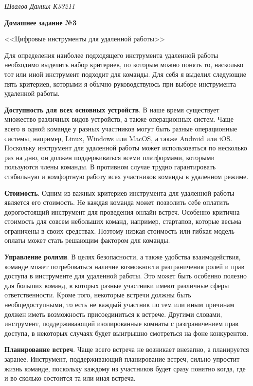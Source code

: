 \documentclass[a4paper, 14pt]{extarticle}
\begin{document}
\begin{flushright}
  \textit{Швалов Даниил К33211}
\end{flushright}

\begin{center}
  \bfseries
  Домашнее задание №3

  <<Цифровые инструменты для удаленной работы>>
\end{center}

Для определения наиболее подходящего инструмента удаленной работы необходимо
выделить набор критериев, по которым можно понять то, насколько тот или иной
инструмент подходит для команды. Для себя я выделил следующие пять критериев,
которыми я обычно руководствуюсь при выборе инструмента удаленной работы.

\textbf{Доступность для всех основных устройств}. В наше время существует
множество различных видов устройств, а также операционных систем. Чаще всего в
одной команде у разных участников могут быть разные операционные системы,
например, Linux, Windows или MacOS, а также Android или iOS. Поскольку
инструмент для удаленной работы может использоваться по несколько раз на дню,
он должен поддерживаться всеми платформами, которыми пользуются члены команды.
В противном случае трудно гарантировать стабильную и комфортную работу всех
участников команды в удаленном режиме.

\textbf{Стоимость}. Одним из важных критериев инструмента для удаленной работы
является его стоимость. Не каждая команда может позволить себе оплатить
дорогостоящий инструмент для проведения онлайн встреч. Особенно критична
стоимость для совсем небольших команд, например, стартапов, которые весьма
ограничены в своих средствах. Поэтому низкая стоимость или гибкая модель оплаты
может стать решающим фактором для команды.

\textbf{Управление ролями}. В целях безопасности, а также удобства
взаимодействия, команде может потребоваться наличие возможности разграничения
ролей и прав доступа в инструменте для удаленной работы. Это может быть
особенно полезно для больших команд, в которых разные участники имеют различные
сферы ответственности. Кроме того, некоторые встречи должны быть
необщедоступными, то есть не каждый участник по тем или иным причинам должен
иметь возможность присоединиться к встрече. Другими словами, инструмент,
поддерживающий изолированные комнаты с разграничением прав доступа, в некоторых
случаях будет выигрышно смотреться на фоне конкурентов.

\textbf{Планирование встреч}. Чаще всего встреча не возникает внезапно, а
планируется заранее. Инструмент, поддерживающий планирование встреч, сильно
упростит жизнь команде, поскольку каждому из участников будет сразу понятно
когда, где и во сколько состоится та или иная встреча.
\end{document}
